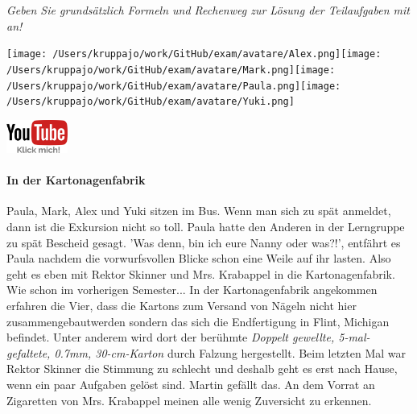 \documentclass[a4paper, 9pt]{scrartcl}\usepackage[]{graphicx}\usepackage[]{xcolor}
\begin{document}
\textit{Geben Sie grundsätzlich Formeln und Rechenweg zur Lösung der Teilaufgaben mit an!} \\[1Ex]
 

 
\ifcollection
\begin{flushright}
\tiny\vspace{-3Ex}
\textbf{\examinhaltstart}
\exammodulemathstat
\vspace{-4Ex}
\end{flushright}
\begin{minipage}[t]{0.5\textwidth}
\texttt{[image: /Users/kruppajo/work/GitHub/exam/avatare/Alex.png]}\hspace{-4mm}\texttt{[image: /Users/kruppajo/work/GitHub/exam/avatare/Mark.png]}\hspace{-4mm}\texttt{[image: /Users/kruppajo/work/GitHub/exam/avatare/Paula.png]}\hspace{-4mm}\texttt{[image: /Users/kruppajo/work/GitHub/exam/avatare/Yuki.png]}
\end{minipage}
\begin{minipage}[t]{0.5\textwidth}
\hfill
\href{https://youtu.be/RuzMjwvwT-4}{\includegraphics[width = 2cm]{img/youtube}}
\end{minipage}
\fi



\ifcollection
\paragraph{In der Kartonagenfabrik}
\fi



Paula, Mark, Alex und Yuki sitzen im Bus. Wenn man sich zu spät anmeldet, dann ist die Exkursion nicht so toll. Paula hatte den Anderen in der Lerngruppe zu spät Bescheid gesagt. 'Was denn, bin ich eure Nanny oder was?!', entfährt es Paula nachdem die vorwurfsvollen Blicke schon eine Weile auf ihr lasten. Also geht es eben mit Rektor Skinner und Mrs. Krabappel in die Kartonagenfabrik. Wie schon im vorherigen Semester... In der Kartonagenfabrik angekommen erfahren die Vier, dass die Kartons zum Versand von Nägeln nicht hier zusammengebautwerden sondern das sich die Endfertigung in Flint, Michigan befindet. Unter anderem wird dort der berühmte \textit{Doppelt gewellte, 5-mal-gefaltete, 0.7mm, 30-cm-Karton} durch
Falzung hergestellt. Beim letzten Mal war Rektor Skinner die Stimmung zu schlecht und deshalb geht es erst nach Hause, wenn ein paar Aufgaben gelöst sind. Martin gefällt das. An dem Vorrat an Zigaretten von Mrs. Krabappel meinen alle wenig Zuversicht zu erkennen.\\
\end{document}
